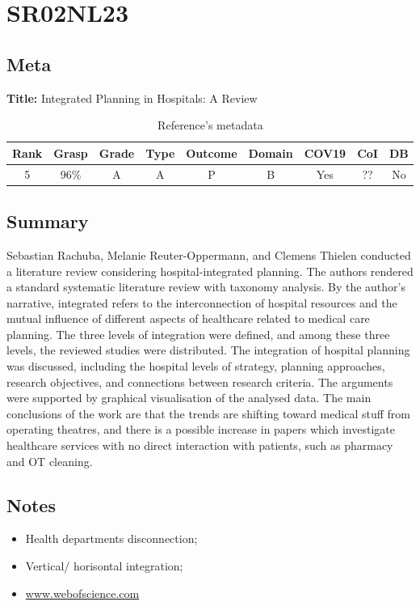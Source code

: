 \section{ SR02NL23 }


\subsection{Meta}

    \textbf{Title:}
    Integrated Planning in Hospitals: A Review

    \begin{table}[H]
        \centering
        \begin{tabular}{|c|c|c|c|c|c|c|c|c|}
            \hline
                \textbf{Rank} & \textbf{Grasp} & \textbf{Grade} & \textbf{Type} & \textbf{Outcome} & \textbf{Domain} & \textbf{COV19} & \textbf{CoI} & \textbf{DB} \\
            \hline
                5 & 96\% & A & A & P & B & Yes & ?? & No \\
            \hline
        \end{tabular}
        \caption{Reference's metadata}
        \label{tab:SR02NL23}
    \end{table}

\subsection{Summary}
    Sebastian Rachuba, Melanie Reuter-Oppermann, and Clemens Thielen conducted a literature review considering hospital-integrated planning. The authors rendered a standard systematic literature review with taxonomy analysis. By the author's narrative, integrated refers to the interconnection of hospital resources and the mutual influence of different aspects of healthcare related to medical care planning. The three levels of integration were defined, and among these three levels, the reviewed studies were distributed. The integration of hospital planning was discussed, including the hospital levels of strategy, planning approaches, research objectives, and connections between research criteria. The arguments were supported by graphical visualisation of the analysed data. The main conclusions of the work are that the trends are shifting toward medical stuff from operating theatres, and there is a possible increase in papers which investigate healthcare services with no direct interaction with patients, such as pharmacy and OT cleaning. 
    

\subsection{Notes}
    \begin{itemize}
        \item Health departments disconnection;
        \item Vertical/ horisontal integration;
        \item \url{www.webofscience.com}
    \end{itemize}


